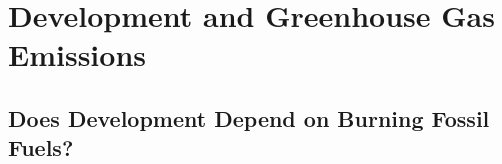 \chapter{Development and Greenhouse Gas Emissions}\label{ch:development_GHG}

\section{Does Development Depend on Burning Fossil Fuels?}